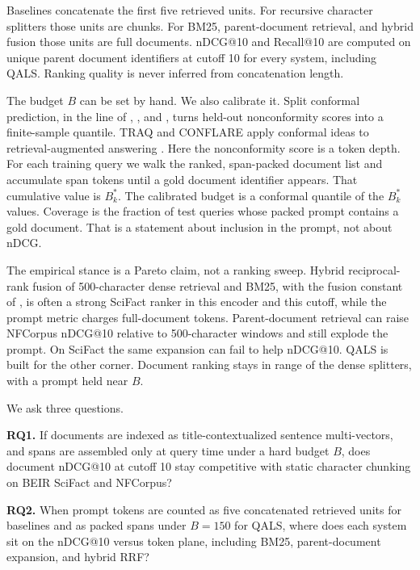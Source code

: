 \documentclass[preprint,12pt,authoryear]{elsarticle}
\begin{document}
Baselines concatenate the first five retrieved units. For recursive character splitters those units are chunks. For BM25, parent-document retrieval, and hybrid fusion those units are full documents. nDCG@10 and Recall@10 are computed on unique parent document identifiers at cutoff 10 for every system, including QALS. Ranking quality is never inferred from concatenation length.

The budget \(B\) can be set by hand. We also calibrate it. Split conformal prediction, in the line of \citet{vovk2005algorithmic}, \citet{lei2018distribution}, and \citet{angelopoulos2023conformal}, turns held-out nonconformity scores into a finite-sample quantile. TRAQ and CONFLARE apply conformal ideas to retrieval-augmented answering \citep{li2024traq,rouzrokh2024conflare}. Here the nonconformity score is a token depth. For each training query we walk the ranked, span-packed document list and accumulate span tokens until a gold document identifier appears. That cumulative value is \(B_k^*\). The calibrated budget is a conformal quantile of the \(B_k^*\) values. Coverage is the fraction of test queries whose packed prompt contains a gold document. That is a statement about inclusion in the prompt, not about nDCG.

The empirical stance is a Pareto claim, not a ranking sweep. Hybrid reciprocal-rank fusion of 500-character dense retrieval and BM25, with the fusion constant of \citet{cormack2009reciprocal}, is often a strong SciFact ranker in this encoder and this cutoff, while the prompt metric charges full-document tokens. Parent-document retrieval can raise NFCorpus nDCG@10 relative to 500-character windows and still explode the prompt. On SciFact the same expansion can fail to help nDCG@10. QALS is built for the other corner. Document ranking stays in range of the dense splitters, with a prompt held near \(B\).

We ask three questions.

\textbf{RQ1.} If documents are indexed as title-contextualized sentence multi-vectors, and spans are assembled only at query time under a hard budget \(B\), does document nDCG@10 at cutoff 10 stay competitive with static character chunking on BEIR SciFact and NFCorpus?

\textbf{RQ2.} When prompt tokens are counted as five concatenated retrieved units for baselines and as packed spans under \(B=150\) for QALS, where does each system sit on the nDCG@10 versus token plane, including BM25, parent-document expansion, and hybrid RRF?
\end{document}
